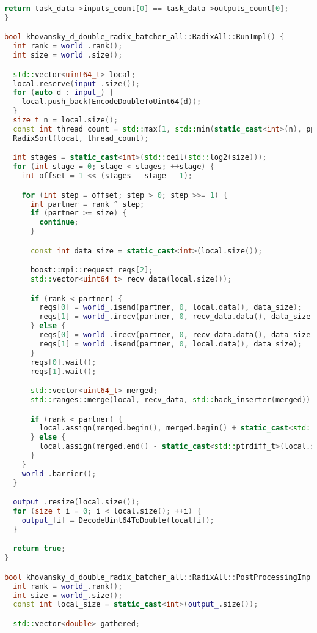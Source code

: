 \documentclass[12pt]{article}
\begin{document}
\begin{lstlisting}[language=C++,
    breaklines=true,       % Автоматический перенос строк
    columns=fullflexible ]
  return task_data->inputs_count[0] == task_data->outputs_count[0];
}

bool khovansky_d_double_radix_batcher_all::RadixAll::RunImpl() {
  int rank = world_.rank();
  int size = world_.size();

  std::vector<uint64_t> local;
  local.reserve(input_.size());
  for (auto d : input_) {
    local.push_back(EncodeDoubleToUint64(d));
  }
  size_t n = local.size();
  const int thread_count = std::max(1, std::min(static_cast<int>(n), ppc::util::GetPPCNumThreads()));
  RadixSort(local, thread_count);

  int stages = static_cast<int>(std::ceil(std::log2(size)));
  for (int stage = 0; stage < stages; ++stage) {
    int offset = 1 << (stages - stage - 1);

    for (int step = offset; step > 0; step >>= 1) {
      int partner = rank ^ step;
      if (partner >= size) {
        continue;
      }

      const int data_size = static_cast<int>(local.size());

      boost::mpi::request reqs[2];
      std::vector<uint64_t> recv_data(local.size());

      if (rank < partner) {
        reqs[0] = world_.isend(partner, 0, local.data(), data_size);
        reqs[1] = world_.irecv(partner, 0, recv_data.data(), data_size);
      } else {
        reqs[0] = world_.irecv(partner, 0, recv_data.data(), data_size);
        reqs[1] = world_.isend(partner, 0, local.data(), data_size);
      }
      reqs[0].wait();
      reqs[1].wait();

      std::vector<uint64_t> merged;
      std::ranges::merge(local, recv_data, std::back_inserter(merged));

      if (rank < partner) {
        local.assign(merged.begin(), merged.begin() + static_cast<std::ptrdiff_t>(local.size()));
      } else {
        local.assign(merged.end() - static_cast<std::ptrdiff_t>(local.size()), merged.end());
      }
    }
    world_.barrier();
  }

  output_.resize(local.size());
  for (size_t i = 0; i < local.size(); ++i) {
    output_[i] = DecodeUint64ToDouble(local[i]);
  }

  return true;
}

bool khovansky_d_double_radix_batcher_all::RadixAll::PostProcessingImpl() {
  int rank = world_.rank();
  int size = world_.size();
  const int local_size = static_cast<int>(output_.size());

  std::vector<double> gathered;


\end{lstlisting}
\end{document}
